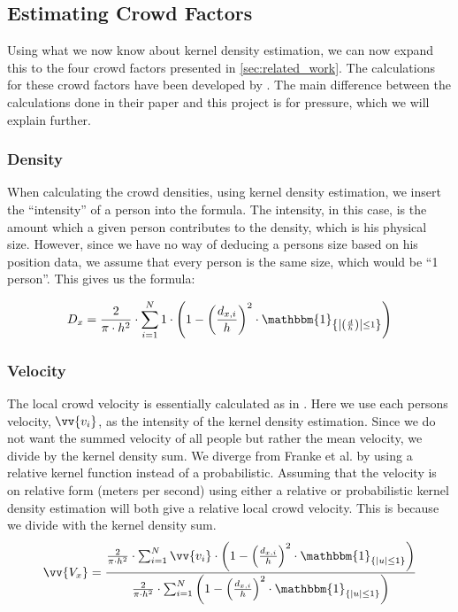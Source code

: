 \subsection{Estimating Crowd Factors}
Using what we now know about kernel density estimation, we can now expand this to the four crowd factors presented in \cref{sec:related_work}. The calculations for these crowd factors have been developed by \citet{wirz2012inferring}. The main difference between the calculations done in their paper and this project is for pressure, which we will explain further.

\subsubsection{Density}
When calculating the crowd densities, using kernel density estimation, we insert the \enquote{intensity} of a person into the formula. The intensity, in this case, is the amount which a given person contributes to the density, which is his physical size. However, since we have no way of deducing a persons size based on his position data, we assume that every person is the same size, which would be \enquote{1 person}. This gives us the formula:

\begin{equation}
\label{eq:sumRelativeDensitiesEpanechnikovWithIntensityWeight}
D_x = \frac{2}{\pi \cdot h^2} \cdot \sum_{i=1}^N 1 \cdot \left(1-\left(\frac{d_{x,i}}{h}\right)^2 \cdot \mathbbm{1}_{\left\{\left|\left(\frac{d}{h}\right)\right| \leq 1\right\}}\right)
\end{equation}


\subsubsection{Velocity}
The local crowd velocity is essentially calculated as in \citet{wirz2012inferring}. Here we use each persons velocity, $\vv{v_i}$, as the intensity of the kernel density estimation. Since we do not want the summed velocity of all people but rather the mean velocity, we divide by the kernel density sum. We diverge from Franke et al. by using a relative kernel function instead of a probabilistic. Assuming that the velocity is on relative form (meters per second) using either a relative or probabilistic kernel density estimation will both give a relative local crowd velocity. This is because we divide with the kernel density sum.
\begin{equation}
\label{eq:}
\vv{V_x} = \frac{\frac{2}{\pi \cdot h^2} \cdot \sum_{i=1}^N \vv{v_i} \cdot \left(1-\left(\frac{d_{x,i}}{h}\right)^2 \cdot \mathbbm{1}_{\{|u| \leq 1\} }\right)}{\frac{2}{\pi \cdot h^2} \cdot \sum_{i=1}^N \left(1-\left(\frac{d_{x,i}}{h}\right)^2 \cdot \mathbbm{1}_{\{|u| \leq 1\} }\right)}
\end{equation}

